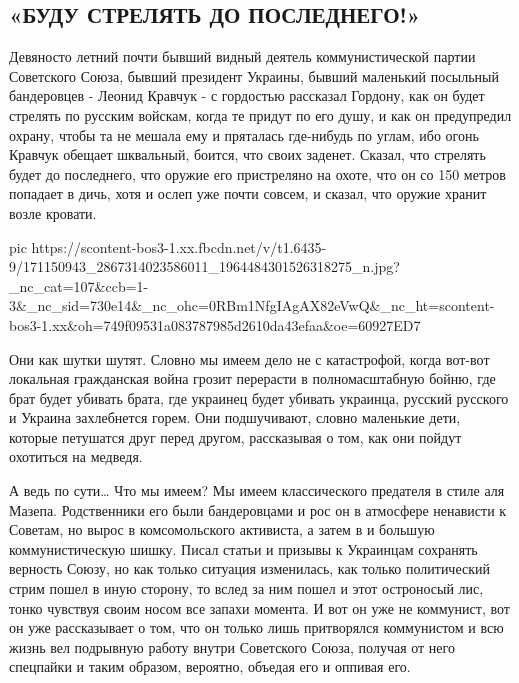  
 
 
 
 

\subsection{«БУДУ СТРЕЛЯТЬ ДО ПОСЛЕДНЕГО!»}

Девяносто летний почти бывший видный деятель коммунистической партии Советского
Союза, бывший президент Украины, бывший маленький посыльный бандеровцев -
Леонид Кравчук - с гордостью рассказал Гордону, как он будет стрелять по
русским войскам, когда те придут по его душу, и как он предупредил охрану,
чтобы та не мешала ему и пряталась где-нибудь по углам, ибо огонь Кравчук
обещает шквальный, боится, что своих заденет. Сказал, что стрелять будет до
последнего, что оружие его пристреляно на охоте, что он со 150 метров попадает
в дичь, хотя и ослеп уже почти совсем, и сказал, что оружие хранит возле
кровати. 

\ifcmt
  pic https://scontent-bos3-1.xx.fbcdn.net/v/t1.6435-9/171150943_2867314023586011_1964484301526318275_n.jpg?_nc_cat=107&ccb=1-3&_nc_sid=730e14&_nc_ohc=0RBm1NfgIAgAX82eVwQ&_nc_ht=scontent-bos3-1.xx&oh=749f09531a083787985d2610da43efaa&oe=60927ED7
\fi

Они как шутки шутят. Словно мы имеем дело не с катастрофой, когда вот-вот
локальная гражданская война грозит перерасти в полномасштабную бойню, где брат
будет убивать брата, где украинец будет убивать украинца, русский русского и
Украина захлебнется горем. Они подшучивают, словно маленькие дети, которые
петушатся друг перед другом, рассказывая о том, как они пойдут охотиться на
медведя. 

А ведь по сути… Что мы имеем? Мы имеем классического предателя в стиле аля
Мазепа. Родственники его были бандеровцами и рос он в атмосфере ненависти к
Советам, но вырос в комсомольского активиста, а затем в и большую
коммунистическую шишку. Писал статьи и призывы к Украинцам сохранять верность
Союзу, но как только ситуация изменилась, как только политический стрим пошел в
иную сторону, то вслед за ним пошел и этот остроносый лис, тонко чувствуя своим
носом все запахи момента. И вот он уже не коммунист, вот он уже рассказывает о
том, что он только лишь притворялся коммунистом и всю жизнь вел подрывную
работу внутри Советского Союза, получая от него спецпайки и таким образом,
вероятно, объедая его и оппивая его. 

